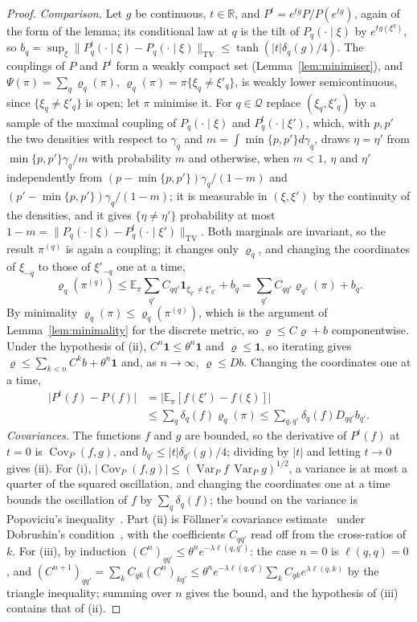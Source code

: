 \documentclass[11pt]{amsart}
\theoremstyle{definition}
\theoremstyle{remark}
\numberwithin{equation}{section}
\newcommand{\R}{\mathbb{R}}
\newcommand{\E}{\mathbb{E}}
\newcommand{\Cov}{\operatorname{Cov}}
\newcommand{\Var}{\operatorname{Var}}
\begin{document}
\begin{proof}
\emph{Comparison.} Let $g$ be continuous, $t\in\R$, and $P^t=e^{tg}P/
P(e^{tg})$, again of the form of the lemma; its conditional law at $q$ is
the tilt of $P_q(\cdot\mid\xi)$ by $e^{tg(\xi^\eta)}$, so $b_q=\sup_\xi
\lVert P^t_q(\cdot\mid\xi)-P_q(\cdot\mid\xi)\rVert_{\mathrm{TV}}\le\tanh
(\lvert t\rvert\delta_q(g)/4)$. The couplings of $P$ and $P^t$ form a
weakly compact set (Lemma~\ref{lem:minimiser}), and $\Psi(\pi)=\sum_q
\varrho_q(\pi)$, $\varrho_q(\pi)=\pi\{\xi_q\ne\xi'_q\}$, is weakly lower
semicontinuous, since $\{\xi_q\ne\xi'_q\}$ is open; let $\pi$ minimise it.
For $q\in\mathcal Q$ replace $(\xi_q,\xi'_q)$ by a sample of the maximal
coupling of $P_q(\cdot\mid\xi)$ and $P^t_q(\cdot\mid\xi')$, which, with
$p,p'$ the two densities with respect to $\gamma_q$ and $m=\int\min\{p,p'\}
d\gamma_q$, draws $\eta=\eta'$ from $\min\{p,p'\}\gamma_q/m$ with probability
$m$ and otherwise, when $m<1$, $\eta$ and $\eta'$ independently from $(p-\min\{p,p'\})
\gamma_q/(1-m)$ and $(p'-\min\{p,p'\})\gamma_q/(1-m)$; it is measurable in
$(\xi,\xi')$ by the continuity of the densities, and it gives
$\{\eta\ne\eta'\}$ probability at most $1-m=\lVert P_q(\cdot\mid\xi)-P^t_q
(\cdot\mid\xi')\rVert_{\mathrm{TV}}$. Both marginals are invariant, so the
result $\pi^{(q)}$ is again a coupling; it changes only $\varrho_q$, and
changing the coordinates of $\xi_{-q}$ to those of $\xi'_{-q}$ one at a
time,
\[
\varrho_q(\pi^{(q)})\le\E_\pi\sum_{q'}C_{qq'}\mathbf 1_{\xi_{q'}\ne
\xi'_{q'}}+b_q=\sum_{q'}C_{qq'}\varrho_{q'}(\pi)+b_q .
\]
By minimality $\varrho_q(\pi)\le\varrho_q(\pi^{(q)})$, which is the argument
of Lemma~\ref{lem:minimality} for the discrete metric, so $\varrho\le
C\varrho+b$ componentwise. Under the hypothesis of (ii), $C^n\mathbf 1\le\theta^n
\mathbf 1$ and $\varrho\le\mathbf 1$, so iterating gives $\varrho\le
\sum_{k<n}C^kb+\theta^n\mathbf 1$ and, as $n\to\infty$, $\varrho\le Db$.
Changing the coordinates one at a time,
\[
\begin{split}
\lvert P^t(f)-P(f)\rvert&=\bigl\lvert\E_\pi[f(\xi')-f(\xi)]\bigr\rvert\\
&\le\sum_q\delta_q(f)\varrho_q(\pi)\le\sum_{q,q'}\delta_q(f)D_{qq'}b_{q'} .
\end{split}
\]
\emph{Covariances.} The functions $f$ and $g$ are bounded, so the
derivative of $P^t(f)$ at $t=0$ is $\Cov_P(f,g)$, and $b_{q'}\le\lvert t
\rvert\delta_{q'}(g)/4$; dividing by $\lvert t\rvert$ and letting $t\to0$
gives (ii). For (i),
$\lvert\Cov_P(f,g)\rvert\le(\Var_Pf\,\Var_Pg)^{1/2}$, a variance is at most
a quarter of the squared oscillation, and changing the coordinates one at
a time bounds the oscillation of $f$ by $\sum_q\delta_q(f)$; the bound on
the variance is Popoviciu's inequality~\cite{Pop35}. Part (ii) is
F\"ollmer's covariance estimate~\cite{Fol82} under Dobrushin's
condition~\cite{Dob68,Dob70}, with the coefficients $C_{qq'}$ read off
from the cross-ratios of $k$. For (iii), by
induction $(C^n)_{qq'}\le\theta^ne^{-\lambda\ell(q,q')}$: the case $n=0$ is
$\ell(q,q)=0$, and $(C^{n+1})_{qq'}=\sum_kC_{qk}(C^n)_{kq'}\le\theta^ne^{-
\lambda\ell(q,q')}\sum_kC_{qk}e^{\lambda\ell(q,k)}$ by the triangle
inequality; summing over $n$ gives the bound, and the hypothesis of (iii)
contains that of (ii).
\end{proof}
\end{document}
